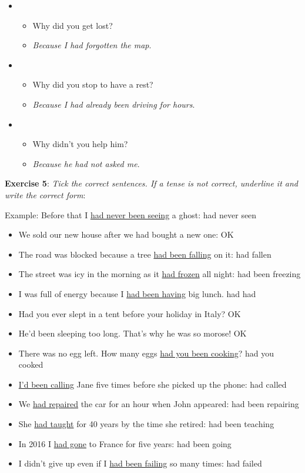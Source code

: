 \begin{itemize}
\item
\begin{itemize}
\item Why did you get lost?
\item \textit{Because I had forgotten the map}.
\end{itemize}

\item
\begin{itemize}
\item Why did you stop to have a rest?
\item \textit{Because I had already been driving for hours}.
\end{itemize} 

\item
\begin{itemize}
\item Why didn't you help him?\
\item \textit{Because he had not asked me}.
\end{itemize}

\end{itemize}

\textbf{Exercise 5}: \textit{Tick the correct sentences. If a tense is not correct, underline it and write the correct form}:

Example: Before that I \underline{had never been seeing} a ghost: had never seen

\begin{itemize}

\item We sold our new house after we had bought a new one: OK
\item The road was blocked because a tree \underline{had been falling} on it: had fallen
\item The street was icy in the morning as it \underline{had frozen} all night: had been freezing
\item I was full of energy because I \underline{had been having} big lunch. had had
\item Had you ever slept in a tent before your holiday in Italy? OK
\item He'd been sleeping too long. That's why he was so morose! OK
\item There was no egg left. How many eggs \underline{had you been cooking}? had you cooked
\item \underline{I'd been calling} Jane five times before she picked up the phone: had called
\item We \underline{had repaired} the car for an hour when John appeared: had been repairing
\item She \underline{had taught} for 40 years by the time she retired: had been teaching
\item In 2016 I \underline{had gone} to France for five years: had been going
\item I didn't give up even if I \underline{had been failing} so many times: had failed

\end{itemize}

